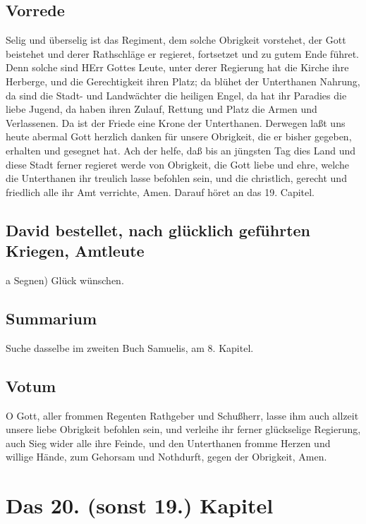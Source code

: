 \section{Vorrede}

Selig und überselig ist das Regiment, dem solche Obrigkeit vorstehet, der Gott beistehet und derer Rathschläge er regieret, fortsetzet und zu gutem Ende führet. Denn solche sind HErr Gottes Leute, unter derer Regierung hat die Kirche ihre Herberge, und die Gerechtigkeit ihren Platz; da blühet der Unterthanen Nahrung, da sind die Stadt- und Landwächter die heiligen Engel, da hat ihr Paradies die liebe Jugend, da haben ihren Zulauf, Rettung und Platz die Armen und Verlassenen. Da ist der Friede eine Krone der Unterthanen. Derwegen laßt uns heute abermal Gott herzlich danken für unsere Obrigkeit, die er bisher gegeben, erhalten und gesegnet hat. Ach der helfe, daß bis an jüngsten Tag dies Land und diese Stadt ferner regieret werde von Obrigkeit, die Gott liebe und ehre, welche die Unterthanen ihr treulich lasse befohlen sein, und die christlich, gerecht und friedlich alle ihr Amt verrichte, Amen. Darauf höret an das 19. Capitel.

\section[David bestellet, nach glücklich geführten Kriegen, Amtleute]{David bestellet, nach glücklich geführten Kriegen, Amtleute}

a Segnen) Glück wünschen.

\section{Summarium}

Suche dasselbe im zweiten Buch Samuelis, am 8. Kapitel.

\section{Votum}

O Gott, aller frommen Regenten Rathgeber und Schußherr, lasse ihm auch allzeit unsere liebe Obrigkeit befohlen sein, und verleihe ihr ferner glückselige Regierung, auch Sieg wider alle ihre Feinde, und den Unterthanen fromme Herzen und willige Hände, zum Gehorsam und Nothdurft, gegen der Obrigkeit, Amen.

\chapter{Das 20. (sonst 19.) Kapitel}

